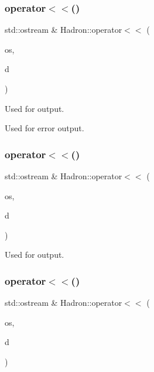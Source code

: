 \subsubsection{\texorpdfstring{operator$<$$<$()}{operator<<()}\hspace{0.1cm}{\footnotesize\ttfamily [7/48]}}
{\footnotesize\ttfamily std\+::ostream \& Hadron\+::operator$<$$<$ (\begin{DoxyParamCaption}\item[{std\+::ostream \&}]{os,  }\item[{const \mbox{\hyperlink{structHadron_1_1KeyHadronNPartNPtCorr__t_1_1NPoint__t}{Key\+Hadron\+N\+Part\+N\+Pt\+Corr\+\_\+t\+::\+N\+Point\+\_\+t}} \&}]{d }\end{DoxyParamCaption})}



Used for output. 

Used for error output. \mbox{\label{namespaceHadron_adfa3adbdb4aad36d2051cad402c7266e}} 
\subsubsection{\texorpdfstring{operator$<$$<$()}{operator<<()}\hspace{0.1cm}{\footnotesize\ttfamily [8/48]}}
{\footnotesize\ttfamily std\+::ostream \& Hadron\+::operator$<$$<$ (\begin{DoxyParamCaption}\item[{std\+::ostream \&}]{os,  }\item[{const \mbox{\hyperlink{structHadron_1_1KeyHadronSUNNPartIrrepOp__t_1_1CGPair__t_1_1Slot__t}{Key\+Hadron\+S\+U\+N\+N\+Part\+Irrep\+Op\+\_\+t\+::\+C\+G\+Pair\+\_\+t\+::\+Slot\+\_\+t}} \&}]{d }\end{DoxyParamCaption})}



Used for output. 

\mbox{\label{namespaceHadron_a61a4a4487102a9f9ee4c9409df53d3ed}} 
\subsubsection{\texorpdfstring{operator$<$$<$()}{operator<<()}\hspace{0.1cm}{\footnotesize\ttfamily [9/48]}}
{\footnotesize\ttfamily std\+::ostream \& Hadron\+::operator$<$$<$ (\begin{DoxyParamCaption}\item[{std\+::ostream \&}]{os,  }\item[{const \mbox{\hyperlink{structHadron_1_1KeyHadronNPartIrrepOp__t_1_1CGPair__t_1_1Slot__t}{Key\+Hadron\+N\+Part\+Irrep\+Op\+\_\+t\+::\+C\+G\+Pair\+\_\+t\+::\+Slot\+\_\+t}} \&}]{d }\end{DoxyParamCaption})}



